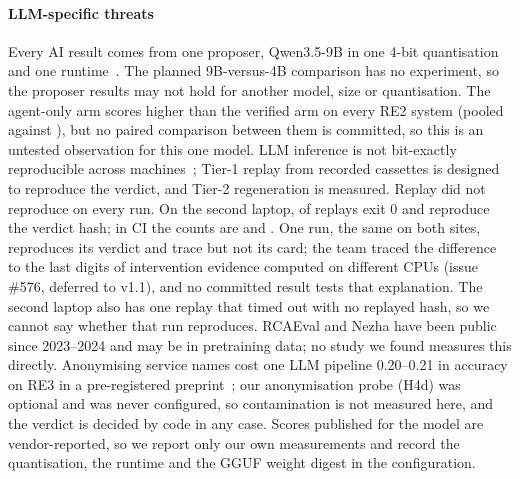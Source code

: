 \paragraph{LLM-specific threats}
Every AI result comes from one proposer, Qwen3.5-9B in one 4-bit quantisation and one runtime~\cite{qwen35card}.
The planned 9B-versus-4B comparison has no experiment, so the proposer results may not hold for another model, size or quantisation.
The agent-only arm scores higher than the verified arm on every RE2 system (pooled  against ), but no paired comparison between them is committed, so this is an untested observation for this one model.
LLM inference is not bit-exactly reproducible across machines~\cite{thinkingmachinesnondeterminism}; Tier-1 replay from recorded cassettes is designed to reproduce the verdict, and Tier-2 regeneration is measured.
Replay did not reproduce on every run.
On the second laptop,  of  replays exit 0 and  reproduce the verdict hash; in CI the counts are  and .
One run, the same on both sites, reproduces its verdict and trace but not its card; the team traced the difference to the last digits of intervention evidence computed on different CPUs (issue \#576, deferred to v1.1), and no committed result tests that explanation.
The second laptop also has one replay that timed out with no replayed hash, so we cannot say whether that run reproduces.
RCAEval and Nezha have been public since 2023--2024 and may be in pretraining data; no study we found measures this directly.
Anonymising service names cost one LLM pipeline 0.20--0.21 in accuracy on RE3 in a pre-registered preprint~\cite{hussain2026prereg}; our anonymisation probe (H4d) was optional and was never configured, so contamination is not measured here, and the verdict is decided by code in any case.
Scores published for the model are vendor-reported, so we report only our own measurements and record the quantisation, the runtime and the GGUF weight digest in the configuration.

